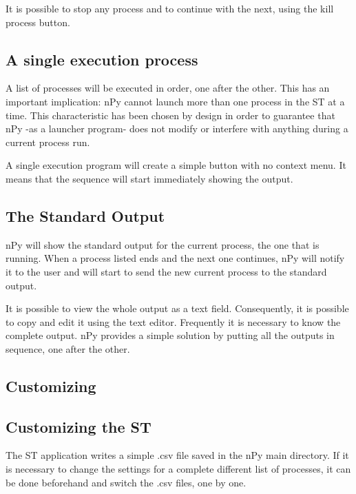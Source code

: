 \documentclass[a4paper,10pt]{article}
\begin{document}
It is possible to stop any process and to continue with the next, using the kill process button.

\subsection{A single execution process}

A list of processes will be executed in order, one after the other. This has an important implication: nPy cannot launch more than one process in the ST at a time. This characteristic has been chosen by design in order to guarantee that nPy -as a launcher program- does not modify or interfere with anything during a current process run.

A single execution program will create a simple button with no context menu. It means that the sequence will start immediately showing the output.

\subsection{The Standard Output}

nPy will show the standard output for the current process, the one that is running. When a process listed ends and the next one continues, nPy will notify it to the user and will start to send the new current process to the standard output.

It is possible to view the whole output as a text field. Consequently, it is possible to copy and edit it using the text editor. Frequently it is necessary to know the complete output. nPy provides a simple solution by putting all the outputs in sequence, one after the other.

\subsection{Customizing}

\subsection{Customizing the ST}

The ST application writes a simple .csv file saved in the nPy main directory. If it is necessary to change the settings for a complete different list of processes, it can be done beforehand and switch the .csv files, one by one.
\end{document}
